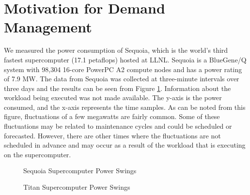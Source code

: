 \section{Motivation for Demand Management}
\label{strategies}
We measured the power consumption of Sequoia, which is the world's third fastest supercomputer (17.1 petaflops) hosted at LLNL. Sequoia is a BlueGene/Q system with 98,304 16-core PowerPC A2 compute nodes and has a power rating of 7.9 MW. The data from Sequoia was collected at three-minute intervals over three days and the results can be seen from Figure \ref{fig:seq}. Information about the workload being executed was not made available. The y-axis is the power consumed, and the x-axis represents the time samples.  As can be noted from this figure, fluctuations of a few megawatts are fairly common. Some of these fluctuations may be related to maintenance cycles and could be scheduled or forecasted. However, there are other times where the fluctuations are not scheduled in advance and may occur as a result of the workload that is executing on the supercomputer. 

\begin{figure}
\begin{center}
\caption{Sequoia Supercomputer Power Swings}
\label{fig:seq}
\end{center}
\end{figure}

\begin{figure}
\begin{center}
\caption{Titan Supercomputer Power Swings}
\label{fig:titan}
\end{center}
\end{figure}

